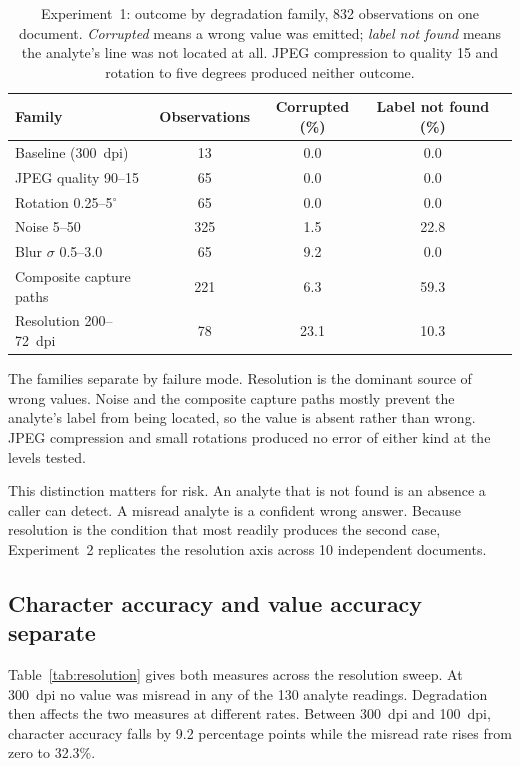 \documentclass[11pt]{article}
\begin{document}
\begin{table}[t]
\centering
\caption{Experiment~1: outcome by degradation family, 832 observations on one document.
\emph{Corrupted} means a wrong value was emitted; \emph{label not found} means the analyte's line
was not located at all. JPEG compression to quality 15 and rotation to five degrees produced
neither outcome.}
\label{tab:families}
\small
\begin{tabular}{lcccc}
\toprule
Family & Observations & Corrupted (\%) & Label not found (\%) \\
\midrule
Baseline (300~dpi) & 13  & \phantom{0}0.0 & \phantom{0}0.0 \\
JPEG quality 90--15 & 65  & \phantom{0}0.0 & \phantom{0}0.0 \\
Rotation 0.25--5$^\circ$ & 65  & \phantom{0}0.0 & \phantom{0}0.0 \\
Noise 5--50 & 325 & \phantom{0}1.5 & 22.8 \\
Blur $\sigma$ 0.5--3.0 & 65  & \phantom{0}9.2 & \phantom{0}0.0 \\
Composite capture paths & 221 & \phantom{0}6.3 & 59.3 \\
Resolution 200--72~dpi & 78  & 23.1 & 10.3 \\
\bottomrule
\end{tabular}
\end{table}

The families separate by failure mode. Resolution is the dominant source of wrong values.
Noise and the composite capture paths mostly prevent the analyte's label from being located, so
the value is absent rather than wrong. JPEG compression and small rotations produced no error of
either kind at the levels tested.

This distinction matters for risk. An analyte that is not found is an absence a caller can
detect. A misread analyte is a confident wrong answer. Because resolution is the condition that
most readily produces the second case, Experiment~2 replicates the resolution axis across 10
independent documents.

\subsection{Character accuracy and value accuracy separate}

Table~\ref{tab:resolution} gives both measures across the resolution sweep. At 300~dpi no
value was misread in any of the 130 analyte readings. Degradation then affects the two measures
at different rates. Between 300~dpi and 100~dpi, character accuracy falls by
9.2 percentage points while the misread rate rises from zero to 32.3\%.
\end{document}
